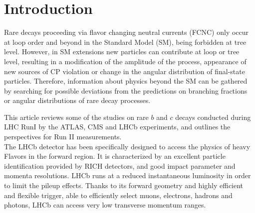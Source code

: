 %
%
%
\section{Introduction}

Rare decays proceeding via flavor changing neutral currents (FCNC) only occur at loop order and beyond in the Standard Model (SM), being forbidden at tree level.
However, in SM extensions new particles can contribute at loop or tree level, resulting in a modification of the amplitude of the process, appearance of new sources of CP violation or change in the angular distribution of final-state particles.
Therefore, information about physics beyond the SM can be gathered by searching for possible deviations from the predictions on branching fractions or angular distributions of rare decay processes.

This article reviews some of the studies on rare $b$ and $c$ decays conducted during LHC RunI by the ATLAS\cite{ATLAS}, CMS\cite{CMS} and LHCb\cite{LHCb} experiments, and outlines the perspectives for Run II measurements.\\

The LHCb detector has been specifically designed to access the physics of heavy Flavors in the forward region.
It is characterized by an excellent particle identification provided by RICH detectors, and good impact parameter and momenta resolutions.
LHCb runs at a reduced instantaneous luminosity in order to limit the pileup effects.
Thanks to its forward geometry and highly efficient and flexible trigger, able to efficiently select muons, electrons, hadrons and photons, LHCb can access very low transverse momentum ranges.

